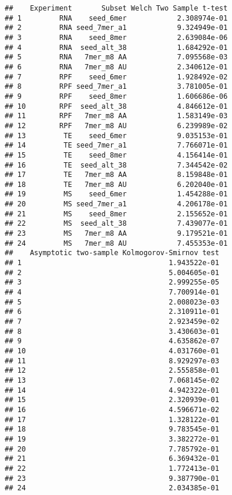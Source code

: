 \documentclass[
]{article}
\begin{document}
\begin{verbatim}
##    Experiment       Subset Welch Two Sample t-test
## 1         RNA    seed_6mer            2.308974e-01
## 2         RNA seed_7mer_a1            9.324949e-01
## 3         RNA    seed_8mer            2.639084e-06
## 4         RNA  seed_alt_38            1.684292e-01
## 5         RNA   7mer_m8 AA            7.095568e-03
## 6         RNA   7mer_m8 AU            2.340612e-01
## 7         RPF    seed_6mer            1.928492e-02
## 8         RPF seed_7mer_a1            3.781005e-01
## 9         RPF    seed_8mer            1.606686e-06
## 10        RPF  seed_alt_38            4.846612e-01
## 11        RPF   7mer_m8 AA            1.583149e-03
## 12        RPF   7mer_m8 AU            6.239989e-02
## 13         TE    seed_6mer            9.035153e-01
## 14         TE seed_7mer_a1            7.766071e-01
## 15         TE    seed_8mer            4.156414e-01
## 16         TE  seed_alt_38            7.344542e-02
## 17         TE   7mer_m8 AA            8.159848e-01
## 18         TE   7mer_m8 AU            6.202040e-01
## 19         MS    seed_6mer            1.454288e-01
## 20         MS seed_7mer_a1            4.206178e-01
## 21         MS    seed_8mer            2.155652e-01
## 22         MS  seed_alt_38            7.439077e-01
## 23         MS   7mer_m8 AA            9.179521e-01
## 24         MS   7mer_m8 AU            7.455353e-01
##    Asymptotic two-sample Kolmogorov-Smirnov test
## 1                                   1.943522e-01
## 2                                   5.004605e-01
## 3                                   2.999255e-05
## 4                                   7.700914e-01
## 5                                   2.008023e-03
## 6                                   2.310911e-01
## 7                                   2.923459e-02
## 8                                   3.430603e-01
## 9                                   4.635862e-07
## 10                                  4.031760e-01
## 11                                  8.929297e-03
## 12                                  2.555858e-01
## 13                                  7.068145e-02
## 14                                  4.942322e-01
## 15                                  2.320939e-01
## 16                                  4.596671e-02
## 17                                  1.328122e-01
## 18                                  9.783545e-01
## 19                                  3.382272e-01
## 20                                  7.785792e-01
## 21                                  6.369432e-01
## 22                                  1.772413e-01
## 23                                  9.387790e-01
## 24                                  2.034385e-01
\end{verbatim}
\end{document}
